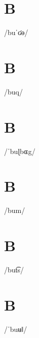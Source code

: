 \documentclass[10pt,a4paper,twoside]{book}
\begin{document}
\section*{B}

\begin{multicols}{3}
 {/buˈʛɵ/} {}
\end{multicols}

\section*{B}

\begin{multicols}{3}
 {/buq/} {}
\end{multicols}

\section*{B}

\begin{multicols}{3}
 {/ˈbuɭbɶg/} {}
\end{multicols}

\section*{B}

\begin{multicols}{3}
 {/bum/} {}
\end{multicols}

\section*{B}

\begin{multicols}{3}
 {/but͡s/} {}
\end{multicols}

\section*{B}

\begin{multicols}{3}
 {/ˈbuʉǁ/} {}
\end{multicols}
\end{document}
